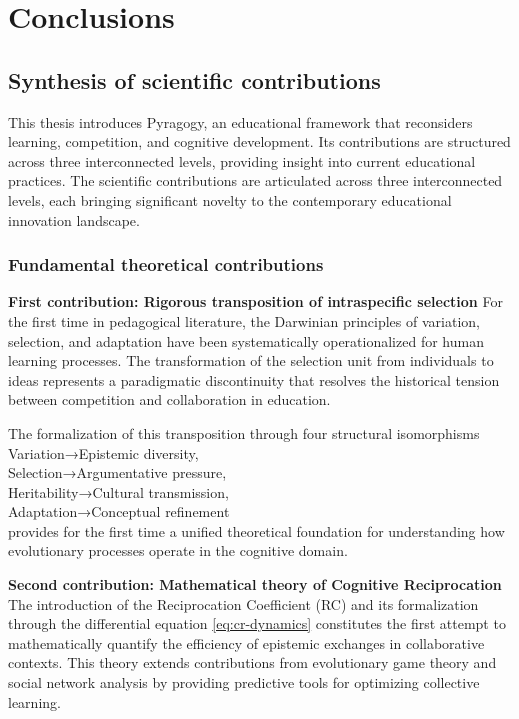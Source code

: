 \chapter{Conclusions}
\label{conclusions}

\section{Synthesis of scientific contributions}

This thesis introduces Pyragogy, an educational framework that reconsiders learning, competition, and cognitive development. Its contributions are structured across three interconnected levels, providing insight into current educational practices. The scientific contributions are articulated across three interconnected levels, each bringing significant novelty to the contemporary educational innovation landscape.

\subsection{Fundamental theoretical contributions}

\textbf{First contribution: Rigorous transposition of intraspecific selection}
For the first time in pedagogical literature, the Darwinian principles of variation, selection, and adaptation have been systematically operationalized for human learning processes. The transformation of the selection unit from individuals to ideas represents a paradigmatic discontinuity that resolves the historical tension between competition and collaboration in education.

The formalization of this transposition through four structural isomorphisms \\
Variation→Epistemic diversity, \\
Selection→Argumentative pressure, \\
Heritability→Cultural transmission, \\
Adaptation→Conceptual refinement \\

provides for the first time a unified theoretical foundation for understanding how evolutionary processes operate in the cognitive domain.

\textbf{Second contribution: Mathematical theory of Cognitive Reciprocation}
The introduction of the Reciprocation Coefficient (RC) and its formalization through the differential equation \ref{eq:cr-dynamics} constitutes the first attempt to mathematically quantify the efficiency of epistemic exchanges in collaborative contexts. This theory extends contributions from evolutionary game theory and social network analysis by providing predictive tools for optimizing collective learning.

